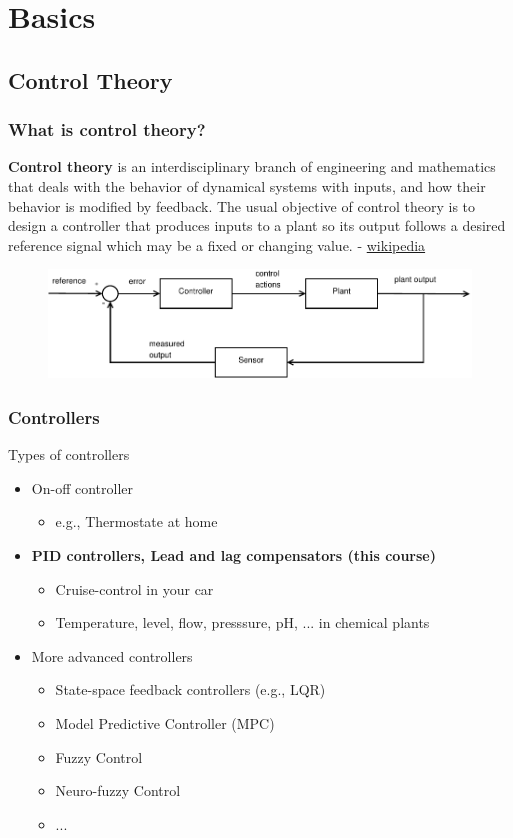 \section{Basics}

\subsection[Control Theory]{Control Theory}
\begin{frame}
\frametitle{What is control theory?}
\begin{block}{}
	\textbf{Control theory} is an interdisciplinary branch of engineering and mathematics that deals with the behavior of dynamical systems with inputs, and how their behavior is modified by feedback. The usual objective of control theory is to design a controller that produces inputs to a plant so its output follows a desired reference signal which may be a fixed or changing value. - \href{https://en.wikipedia.org/wiki/Control_theory}{wikipedia} 
\end{block}
\begin{figure}
	\centering
	\includegraphics[width=1\linewidth]{controlsystem}
	\label{fig:controlsystem}
\end{figure}
\end{frame}

\begin{frame}
	\frametitle{Controllers}
	\begin{block}{Types of controllers}
		\begin{itemize}
			\item On-off controller
			\begin{itemize}
				\item e.g., Thermostate at home
			\end{itemize}
			\item \textbf{PID controllers, Lead and lag compensators (this course)}
			\begin{itemize}
				\item Cruise-control in your car
				\item Temperature, level, flow, presssure, pH, ... in chemical plants
			\end{itemize}
			\item More advanced controllers
			\begin{itemize}
				\item State-space feedback controllers (e.g., LQR)
				\item Model Predictive Controller (MPC)
				\item Fuzzy Control
				\item Neuro-fuzzy Control
				\item ...
			\end{itemize}
		\end{itemize}
	\end{block}
\end{frame}


